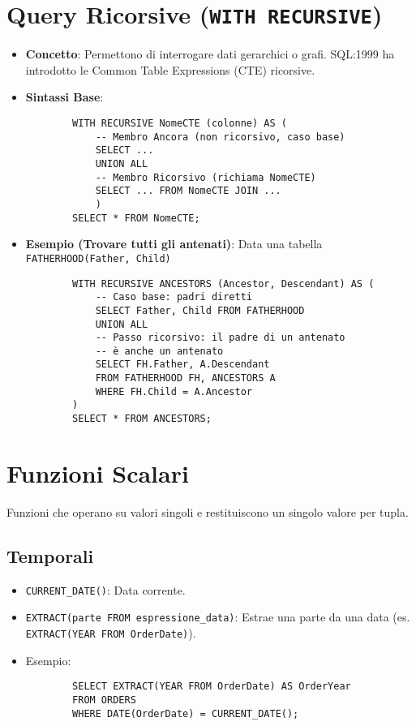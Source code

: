 \documentclass{article}
\begin{document}
	\section{Query Ricorsive (\texttt{WITH RECURSIVE})}
	\begin{itemize}
		\item \textbf{Concetto}: Permettono di interrogare dati gerarchici o grafi. SQL:1999 ha introdotto le Common Table Expressions (CTE) ricorsive.
		\item \textbf{Sintassi Base}:
		\begin{verbatim}
		WITH RECURSIVE NomeCTE (colonne) AS (
			-- Membro Ancora (non ricorsivo, caso base)
			SELECT ...
			UNION ALL
			-- Membro Ricorsivo (richiama NomeCTE)
			SELECT ... FROM NomeCTE JOIN ...
			)
		SELECT * FROM NomeCTE;
		\end{verbatim}
		\item \textbf{Esempio (Trovare tutti gli antenati)}: Data una tabella \texttt{FATHERHOOD(Father, Child)}
		\begin{verbatim}
		WITH RECURSIVE ANCESTORS (Ancestor, Descendant) AS (
			-- Caso base: padri diretti
			SELECT Father, Child FROM FATHERHOOD
			UNION ALL
			-- Passo ricorsivo: il padre di un antenato
			-- è anche un antenato
			SELECT FH.Father, A.Descendant
			FROM FATHERHOOD FH, ANCESTORS A
			WHERE FH.Child = A.Ancestor
		)
		SELECT * FROM ANCESTORS;
		\end{verbatim}
	\end{itemize}
	
	\section{Funzioni Scalari}
	Funzioni che operano su valori singoli e restituiscono un singolo valore per tupla.
	
	\subsection{Temporali}
	\begin{itemize}
		\item \texttt{CURRENT\_DATE()}: Data corrente.
		\item \texttt{EXTRACT(parte FROM espressione\_data)}: Estrae una parte da una data (es. \texttt{EXTRACT(YEAR FROM OrderDate)}).
		\item Esempio:
		\begin{verbatim}
		SELECT EXTRACT(YEAR FROM OrderDate) AS OrderYear
		FROM ORDERS
		WHERE DATE(OrderDate) = CURRENT_DATE();
		\end{verbatim}
	\end{itemize}
	
\end{document}
